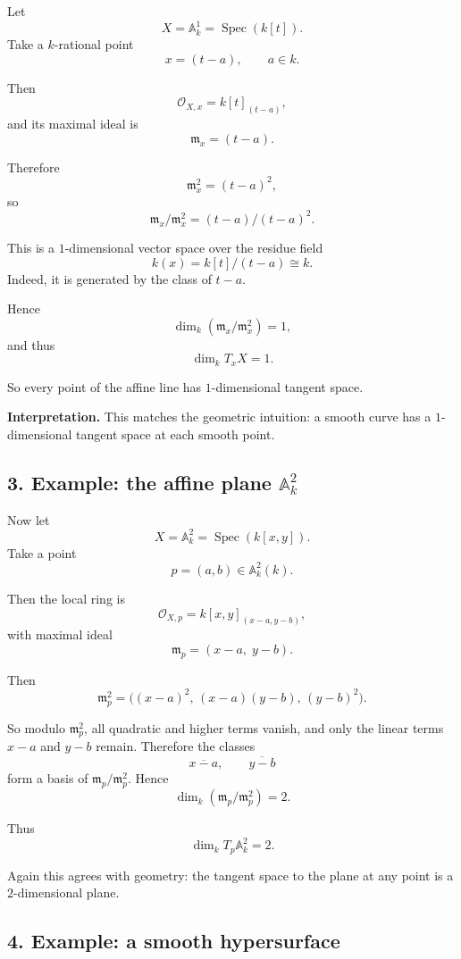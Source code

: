 \documentclass[12pt,a4paper]{article}
\theoremstyle{plain}
\theoremstyle{definition}      %
\begin{document}
	Let
	\[
	X=\mathbb A^1_k=\operatorname{Spec}(k[t]).
	\]
	Take a \(k\)-rational point
	\[
	x=(t-a),\qquad a\in k.
	\]
	
	Then
	\[
	\mathcal O_{X,x}=k[t]_{(t-a)},
	\]
	and its maximal ideal is
	\[
	\mathfrak m_x=(t-a).
	\]
	
	Therefore
	\[
	\mathfrak m_x^2=(t-a)^2,
	\]
	so
	\[
	\mathfrak m_x/\mathfrak m_x^2
	=
	(t-a)/(t-a)^2.
	\]
	
	This is a \(1\)-dimensional vector space over the residue field
	\[
	k(x)=k[t]/(t-a)\cong k.
	\]
	Indeed, it is generated by the class of \(t-a\).
	
	Hence
	\[
	\dim_k(\mathfrak m_x/\mathfrak m_x^2)=1,
	\]
	and thus
	\[
	\dim_k T_xX=1.
	\]
	
	So every point of the affine line has \(1\)-dimensional tangent space.
	
	\medskip
	
	\textbf{Interpretation.}
	This matches the geometric intuition: a smooth curve has a \(1\)-dimensional tangent space at each smooth point.
	
	\subsection*{3. Example: the affine plane \(\mathbb A^2_k\)}
	
	Now let
	\[
	X=\mathbb A^2_k=\operatorname{Spec}(k[x,y]).
	\]
	Take a point
	\[
	p=(a,b)\in \mathbb A^2_k(k).
	\]
	
	Then the local ring is
	\[
	\mathcal O_{X,p}=k[x,y]_{(x-a,y-b)},
	\]
	with maximal ideal
	\[
	\mathfrak m_p=(x-a,\;y-b).
	\]
	
	Then
	\[
	\mathfrak m_p^2=\bigl((x-a)^2,\,(x-a)(y-b),\,(y-b)^2\bigr).
	\]
	
	So modulo \(\mathfrak m_p^2\), all quadratic and higher terms vanish, and only the linear terms \(x-a\) and \(y-b\) remain. Therefore the classes
	\[
	\overline{x-a},\qquad \overline{y-b}
	\]
	form a basis of \(\mathfrak m_p/\mathfrak m_p^2\). Hence
	\[
	\dim_k(\mathfrak m_p/\mathfrak m_p^2)=2.
	\]
	
	Thus
	\[
	\dim_k T_p\mathbb A^2_k=2.
	\]
	
	Again this agrees with geometry: the tangent space to the plane at any point is a \(2\)-dimensional plane.
	
	\subsection*{4. Example: a smooth hypersurface}
	
\end{document}
